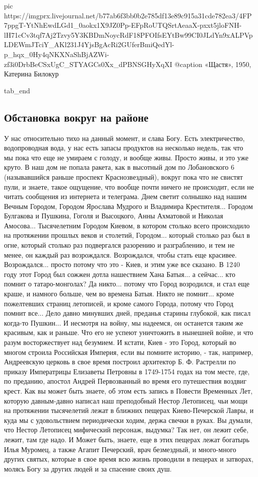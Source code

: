 		 pic https://imgprx.livejournal.net/b77ab6f3bb0b2e785df13e89c915a31cde782ea3/4FP7ppgT-YtNhEwdLGd1_0aokx1X9JZ0Pp-EFpRoUTQSrtAeaaX-pxxt5jloFNH-lH71cCv3tqf7Aj2Tzvy5Y3KBDmNoycRdF18PFOIfsEYtBw99CI0JLdYn9xALPVpLDEWmJTciY_AKl231J4YjsBgAcRi2GUferBmiQedYl-p_hqx_0Hy4qNKXNaShBjAZWi-zf3i0DrbBeCSxUgC_STYAGCs0Xx_dPBNSGHyXqXI
		 @caption «Щастя», 1950, Катерина Билокур

  tab_end
\fi

\subsection{Обстановка вокруг на районе}

У нас относительно тихо на данный момент,
и слава Богу. Есть электричество, водопроводная вода, у нас есть запасы
продуктов на несколько недель, так что мы пока что еще не умираем с голоду, и
вообще живы. Просто живы, и это уже круто.  В наш дом не попала ракета, как в
высотный дом по Лобановского 6 (называвшийся раньше проспект Краснозвездный),
вокруг пока что не свистят пули, и знаете, такое ощущение, что вообще почти
ничего не происходит, если не читать сообщения из интернета и телеграма.  Днем
светит солнышко над нашим Вечным Городом, Городом Ярослава Мудрого и Владимира
Крестителя... Городом Булгакова и Пушкина, Гоголя и Высоцкого, Анны Ахматовой и
Николая Амосова... Тысячелетним Городом Киевом, в котором столько всего
происходило на протяжении прошлых веков и столетий, Городом... который столько раз был в
огне, который столько раз подвергался разорению и разграблению, и тем не менее,
он каждый раз возрождался. Возрождался, чтобы стать еще красивее. Возрождался... 
просто потому что это - Киев, и этим уже все сказано. В 1240 году
этот Город был сожжен дотла нашествием Хана Батыя... а сейчас... кто помнит о
татаро-монголах?  Да никто...  потому что Город возродился, и стал еще краше, и
намного больше, чем во времена Батыя.  Никто не помнит... кроме пожелтевших
страниц летописей, и кроме самого Города, потому что Город помнит все... Дело
давно минувших дней, преданья старины глубокой, как писал когда-то Пушкин... И
несмотря на войну, мы надеемся, он останется таким же красивым, как и раньше.
Что его не успеют уничтожить в нынешней войне, и что разум восторжествует над
безумием.  И кстати, Киев - это Город, который во многом строила Российская
Империя, если вы помните историю, - так, например, Андреевскую церковь в свое
время построил архитектор Б. Ф. Растрелли по приказу Императрицы Елизаветы
Петровны в 1749-1754 годах на том месте, где, по преданию, апостол Андрей
Первозванный во время его путешествия воздвиг крест. Как вы может быть знаете,
об этом есть запись в Повести Временных Лет, которую давным-давно написал наш
преподобный Нестор Летописец, чьи мощи на протяжении тысячелетий лежат в
ближних пещерах Киево-Печерской Лавры, и куда мы с удовольствием периодически
ходим, держа свечки в руках. Вы думали, что Нестор Летописец мифический
персонаж, выдумка? Так нет, он лежит себе, лежит, там где надо.  И Может быть,
знаете, еще в этих пещерах лежат богатырь Илья Муромец, а также Агапит
Печерский, врач безмездный, и много-много других святых, которые в свое время
всю жизнь проводили в пещерах и затворах, молясь Богу за других людей и за
спасение своих душ.

